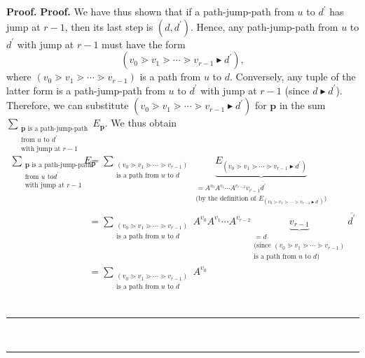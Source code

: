\documentclass[numbers=enddot,12pt,final,onecolumn,notitlepage]{scrartcl}%
\theoremstyle{definition}
\newenvironment{verlong}{}{}
\newcommand{\downslack}{A}
\newenvironment{proof}[1][Proof]{\noindent\textbf{#1.} }{\ \rule{0.5em}{0.5em}}
\let\sumnonlimits\sum
\renewcommand{\sum}{\sumnonlimits\limits}
\begin{document}
\begin{proof}
\begin{proof}
\begin{verlong}
We have thus shown that if a path-jump-path from $u$ to $d^{\prime}$ has jump
at $r-1$, then its last step is $\left(  d,d^{\prime}\right)  $. Hence, any
path-jump-path from $u$ to $d^{\prime}$ with jump at $r-1$ must have the form%
\[
\left(  v_{0}\gtrdot v_{1}\gtrdot\cdots\gtrdot v_{r-1}\blacktriangleright
d^{\prime}\right)  ,
\]
where $\left(  v_{0}\gtrdot v_{1}\gtrdot\cdots\gtrdot v_{r-1}\right)  $ is a
path from $u$ to $d$. Conversely, any tuple of the latter form is a
path-jump-path from $u$ to $d^{\prime}$ with jump at $r-1$ (since
$d\blacktriangleright d^{\prime}$). Therefore, we can substitute $\left(
v_{0}\gtrdot v_{1}\gtrdot\cdots\gtrdot v_{r-1}\blacktriangleright d^{\prime
}\right)  $ for $\mathbf{p}$ in the sum $\sum_{\substack{\mathbf{p}\text{ is a
path-jump-path}\\\text{from }u\text{ to }d^{\prime}\\\text{with jump at }%
r-1}}E_{\mathbf{p}}$. We thus obtain%
\begin{align*}
\sum_{\substack{\mathbf{p}\text{ is a path-jump-path}\\\text{from }u\text{ to
}d^{\prime}\\\text{with jump at }r-1}}E_{\mathbf{p}}  &  =\sum
_{\substack{\left(  v_{0}\gtrdot v_{1}\gtrdot\cdots\gtrdot v_{r-1}\right)
\\\text{is a path from }u\text{ to }d}}\underbrace{E_{\left(  v_{0}\gtrdot
v_{1}\gtrdot\cdots\gtrdot v_{r-1}\blacktriangleright d^{\prime}\right)  }%
}_{\substack{=\downslack^{v_{0}}\downslack^{v_{1}}\cdots\downslack^{v_{r-2}%
}v_{r-1}\overline{d^{\prime}}\\\text{(by the definition of }E_{\left(
v_{0}\gtrdot v_{1}\gtrdot\cdots\gtrdot v_{r-1}\blacktriangleright d^{\prime
}\right)  }\text{)}}}\\
&  =\sum_{\substack{\left(  v_{0}\gtrdot v_{1}\gtrdot\cdots\gtrdot
v_{r-1}\right)  \\\text{is a path from }u\text{ to }d}}\downslack^{v_{0}%
}\downslack^{v_{1}}\cdots\downslack^{v_{r-2}}\underbrace{v_{r-1}%
}_{\substack{=d\\\text{(since }\left(  v_{0}\gtrdot v_{1}\gtrdot\cdots\gtrdot
v_{r-1}\right)  \\\text{is a path from }u\text{ to }d\text{)}}}\overline
{d^{\prime}}\\
&  =\sum_{\substack{\left(  v_{0}\gtrdot v_{1}\gtrdot\cdots\gtrdot
v_{r-1}\right)  \\\text{is a path from }u\text{ to }d}}\downslack^{v_{0}%
}
\end{align*}
\end{verlong}
\end{proof}
\end{proof}
\end{document}
